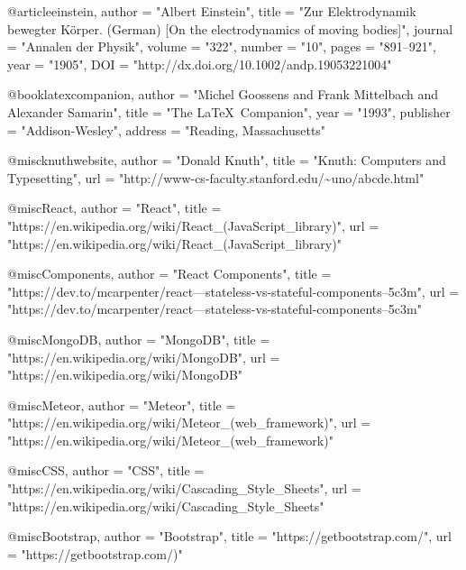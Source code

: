 @article{einstein,
    author =       "Albert Einstein",
    title =        "{Zur Elektrodynamik bewegter K{\"o}rper}. ({German})
        [{On} the electrodynamics of moving bodies]",
    journal =      "Annalen der Physik",
    volume =       "322",
    number =       "10",
    pages =        "891--921",
    year =         "1905",
    DOI =          "http://dx.doi.org/10.1002/andp.19053221004"
}
 
@book{latexcompanion,
    author    = "Michel Goossens and Frank Mittelbach and Alexander Samarin",
    title     = "The \LaTeX\ Companion",
    year      = "1993",
    publisher = "Addison-Wesley",
    address   = "Reading, Massachusetts"
}
 
@misc{knuthwebsite,
    author    = "Donald Knuth",
    title     = "Knuth: Computers and Typesetting",
    url       = "http://www-cs-faculty.stanford.edu/\~{}uno/abcde.html"
}

@misc{React,
	author    = "React",
	title     = "https://en.wikipedia.org/wiki/React_(JavaScript_library)",
	url       = "https://en.wikipedia.org/wiki/React_(JavaScript_library)"
}

@misc{Components,
	author    = "React Components",
	title     = "https://dev.to/mcarpenter/react---stateless-vs-stateful-components--5c3m",
	url       = "https://dev.to/mcarpenter/react---stateless-vs-stateful-components--5c3m"
}

@misc{MongoDB,
	author    = "MongoDB",
	title     = "https://en.wikipedia.org/wiki/MongoDB",
	url       = "https://en.wikipedia.org/wiki/MongoDB"
}

@misc{Meteor,
	author    = "Meteor",
	title     = "https://en.wikipedia.org/wiki/Meteor_(web_framework)",
	url       = "https://en.wikipedia.org/wiki/Meteor_(web_framework)"
}

@misc{CSS,
	author    = "CSS",
	title     = "https://en.wikipedia.org/wiki/Cascading_Style_Sheets",
	url       = "https://en.wikipedia.org/wiki/Cascading_Style_Sheets"
}

@misc{Bootstrap,
	author    = "Bootstrap",
	title     = "https://getbootstrap.com/",
	url       = "https://getbootstrap.com/)"
}